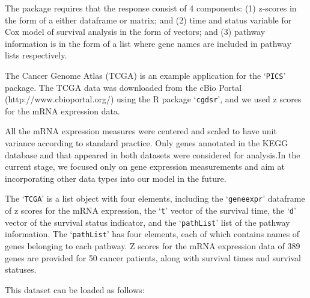 \documentclass[11pt]{article}
\begin{document}
The package requires that the response consist of 4 components:
(1) z-scores in the form of a either dataframe or matrix; and
(2) time and status variable for Cox model of survival analysis in the form of vectors; and
(3) pathway information is in the form of a list where gene names are included in pathway lists respectively.

The Cancer Genome Atlas (TCGA) is an example application for the `\texttt{PICS}' package.
The TCGA data was downloaded from the cBio Portal (http://www.cbioportal.org/) using the R package `\texttt{cgdsr}', and we used z scores for the mRNA expression data.

All the mRNA expression measures were centered and scaled to have unit variance according to standard practice. Only genes annotated in the KEGG database and that appeared in both datasets were considered for analysis.In the current stage, we focused only on gene expression measurements and aim at incorporating other data types into our model in the future.

The `\texttt{TCGA}' is a list object with four elements, including the `\texttt{geneexpr}' dataframe of z scores for the mRNA expression, the `\texttt{t}' vector of the survival time, the `\texttt{d}' vector of the survival status indicator, and the `\texttt{pathList}' list of the pathway information. The `\texttt{pathList}' has four elements, each of which contains names of genes belonging to each pathway. Z scores for the mRNA expression data of 389 genes are provided for 50 cancer patients, along with survival times and survival statuses.

This dataset can be loaded as follows:
\end{document}
